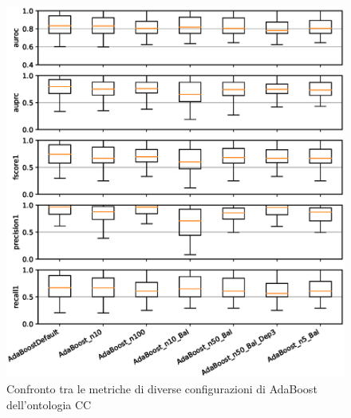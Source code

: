 \documentclass[12pt,a4paper,oneside,hidelinks]{report}
\begin{document}
\vspace*{\fill}

\begin{figure}[hb]%
    \centering
    \includegraphics[scale = 0.80]{CC-AdaBoost-level1.eps}%
    \caption{Confronto tra le metriche di diverse configurazioni di AdaBoost dell'ontologia CC}%
    \label{figure:liv1.1}%
\end{figure}

\vspace*{\fill}

\vspace*{\fill}
\end{document}
